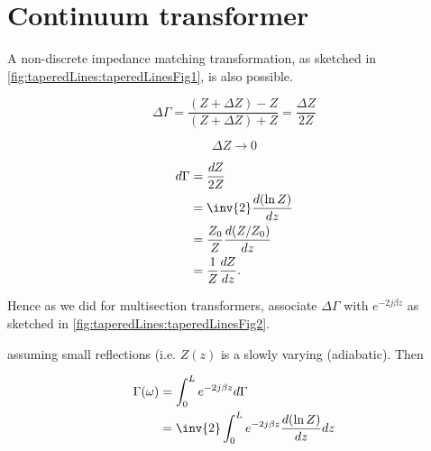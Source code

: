 %
%
\section{Continuum transformer}

A non-discrete impedance matching transformation, as sketched in \cref{fig:taperedLines:taperedLinesFig1}, is also possible.


\begin{equation}\label{eqn:continuumAndOtherTransformersCore:820}
\Delta \Gamma
= \frac{ (Z + \Delta Z) - Z }{(Z + \Delta Z) + Z}
= \frac{\Delta Z}{2 Z}
\end{equation}

\begin{equation}\label{eqn:continuumAndOtherTransformersCore:840}
\Delta Z \rightarrow 0
\end{equation}

\begin{equation}\label{eqn:continuumAndOtherTransformersCore:860}
\begin{aligned}
d\Gamma
&= \frac{dZ}{2 Z}
\\ &= \inv{2} \frac{d (\ln Z)}{dz}
\\ &= \frac{Z_0}{Z} \frac{d (Z/Z_0)}{dz}
\\ &= \frac{1}{Z} \frac{d Z}{dz}.
\end{aligned}
\end{equation}

Hence as we did for multisection transformers, associate \( \Delta \Gamma \) with \( e^{- 2j \beta z} \) as sketched in \cref{fig:taperedLines:taperedLinesFig2}.


assuming small reflections (i.e. \( Z(z) \) is a slowly varying (adiabatic).  Then

\begin{equation}\label{eqn:continuumAndOtherTransformersCore:920}
\begin{aligned}
\Gamma(\omega)
&= \int_0^L e^{ -2 j \beta z} d\Gamma
\\ &= \inv{2}
\int_0^L e^{ -2 j \beta z}  \frac{d (\ln Z)}{dz} dz
\end{aligned}
\end{equation}

